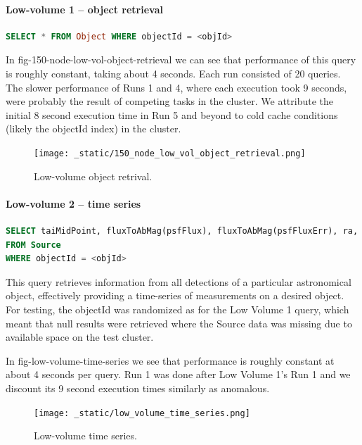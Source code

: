 \documentclass[DM,lsstdraft,toc]{lsstdoc}
\begin{document}
\paragraph{Low-volume 1 -- object
retrieval}\label{low-volume-1-object-retrieval}

\begin{lstlisting}[language=SQL]
SELECT * FROM Object WHERE objectId = <objId>
\end{lstlisting}

In fig-150-node-low-vol-object-retrieval we can see that performance of
this query is roughly constant, taking about 4 seconds. Each run
consisted of 20 queries. The slower performance of Runs 1 and 4, where
each execution took 9 seconds, were probably the result of competing
tasks in the cluster. We attribute the initial 8 second execution time
in Run 5 and beyond to cold cache conditions (likely the objectId index)
in the cluster.

\begin{figure}[H]
\centering
\texttt{[image: \_static/150\_node\_low\_vol\_object\_retrieval.png]}
\caption{Low-volume object retrival.}
\end{figure}

\paragraph{Low-volume 2 -- time series}\label{low-volume-2-time-series}

\begin{lstlisting}[language=SQL]
SELECT taiMidPoint, fluxToAbMag(psfFlux), fluxToAbMag(psfFluxErr), ra, decl
FROM Source
WHERE objectId = <objId>
\end{lstlisting}

This query retrieves information from all detections of a particular
astronomical object, effectively providing a time-series of measurements
on a desired object. For testing, the objectId was randomized as for the
Low Volume 1 query, which meant that null results were retrieved where
the Source data was missing due to available space on the test cluster.

In fig-low-volume-time-series we see that performance is roughly
constant at about 4 seconds per query. Run 1 was done after Low Volume
1's Run 1 and we discount its 9 second execution times similarly as
anomalous.

\begin{figure}[H]
\centering
\texttt{[image: \_static/low\_volume\_time\_series.png]}
\caption{Low-volume time series.}
\end{figure}
\end{document}

